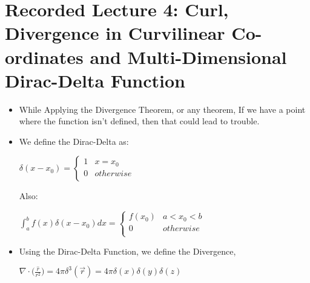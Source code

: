 \documentclass{article}
\begin{document}
\section {Recorded Lecture 4: Curl, Divergence in Curvilinear Co-ordinates and Multi-Dimensional Dirac-Delta Function}

\begin{itemize}
  \item While Applying the Divergence Theorem, or any theorem, If we have a point where the function isn't defined, then that could lead to trouble.
  \item We define the Dirac-Delta as: \\
  \begin{center}
    $  \delta (x-x_0) = \begin{cases}
                      1 & x = x_0 \\
                      0 & otherwise \\
                  \end{cases}$
  \end{center}

  Also: \\
  \begin{center}
    $  \int_{a}^{b}{f(x) \delta (x-x_0) dx} = \begin{cases}
                      f(x_0) & a < x_0 < b \\
                      0 & otherwise \\
                  \end{cases}$
  \end{center}

  \item Using the Dirac-Delta Function, we define the Divergence,
  \begin{center}
    $ \nabla \cdot \big( \frac{\hat{r}}{r^2} \big) = 4 \pi \delta ^{3} (\vec{r}) = 4 \pi \delta (x) \delta (y) \delta (z)$
  \end{center}


\end{itemize}
\end{document}
